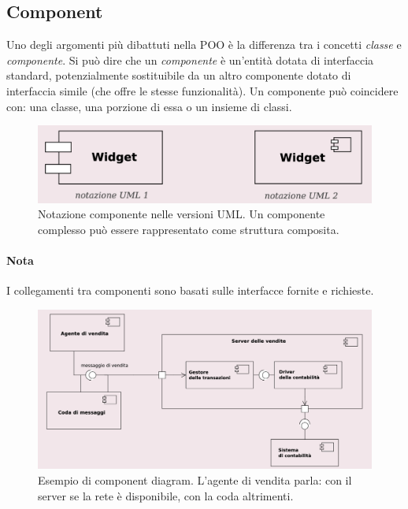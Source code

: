 \subsection{Component}

Uno degli argomenti più dibattuti nella POO è la differenza tra i concetti \textit{classe} e \textit{componente}. Si può dire che un \textit{componente} è un'entità dotata di interfaccia standard, potenzialmente sostituibile da un altro componente dotato di interfaccia simile (che offre le stesse funzionalità). Un componente può coincidere con: una classe, una porzione di essa o un insieme di classi.

\begin{figure}[h!]
    \centering
    \includegraphics[width=0.75\linewidth]{assets/UML/component/component-1.png}
    \caption{Notazione componente nelle versioni UML. Un componente complesso può essere rappresentato come struttura composita.}
\end{figure}

\paragraph{Nota} I collegamenti tra componenti sono basati sulle interfacce fornite e richieste.

\begin{figure}[h!]
    \centering
    \includegraphics[width=0.75\linewidth]{assets/UML/component/component-2.png}
    \caption{Esempio di component diagram. L'agente di vendita parla: con il server se la rete è disponibile, con la coda altrimenti.}
\end{figure}

\newpage